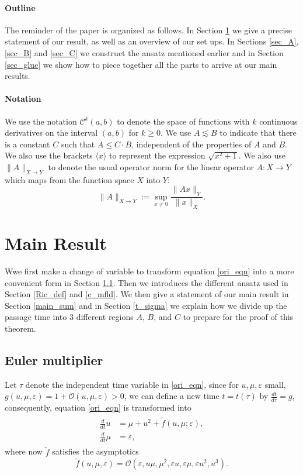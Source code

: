 \documentclass[letterpaper,11pt]{article}
\newcommand{\rmO}{\mathcal{O}}
\newcommand{\eps}{\varepsilon}
\newcommand{\lar}{ \lesssim }
\numberwithin{equation}{section}
\theoremstyle{plain}
\begin{document}
\paragraph{Outline}
The reminder of the paper is organized as follows. In Section \ref{sec_main} we give a precise statement of our result, as well as an overview of our set ups. In Sections \ref{sec_A}, \ref{sec_B} and \ref{sec_C} we construct the ansatz mentioned earlier and in Section \ref{sec_glue} we show how to piece together all the parts to arrive at our main results.


\paragraph{Notation}We use the notation $\mathcal{C}^k(a,b)$ to denote the space of functions with $k$ continuous derivatives on the interval $(a,b)$ for $k\ge 0$.  
We use $A \lar B$ to indicate that there is a constant $C$ such that $A \le C \cdot B$, independent of the properties of $A$ and $B$. We also use the brackets $\langle x \rangle$ to represent the expression $\sqrt{x^2+1}$. We also use $\|A\|_{X\to Y}$ to denote the usual operator norm for the linear operator $A: X\to Y$ which maps from the function space $X$ into $Y$:
\[
\|A\|_{X\to Y} := \sup_{ x\neq 0} \frac{\|Ax\|_Y}{\|x\|_X}.
\]



\section{Main Result}\label{sec_main}
Wwe first make a change of variable to transform equation \eqref{ori_eqn} into a more convenient form in Section \ref{euler_m}. Then we introduces the different ansatz used in Section \ref{Ric_def} and \ref{c_mfld}. We then give a statement of our main result in Section \ref{main_sum} and in Section \ref{t_sigma} we explain how we divide up the passage time into 3 different regions $A$, $B$, and $C$ to prepare for the proof of this theorem.

\subsection{Euler multiplier}\label{euler_m}
Let $\tau$ denote the independent time variable in \eqref{ori_eqn}, since for $u,\mu,\eps$ small, $g(u,\mu,\eps) = 1 + \rmO(u,\mu,\eps)>0$, we can define a new time $t = t(\tau)$ by $\frac{dt}{d\tau} = g$, consequently, equation \eqref{ori_eqn}  is transformed into
\begin{align}\label{euler_ori_eqn}
\begin{split}
\frac{d}{dt}u &= \mu+u^2+ \tilde{f}(u,\mu;\eps),\\
\frac{d}{dt}\mu &=  \eps ,
\end{split}
\end{align}
where now $\tilde{f}$ satisfies the asymptotics
\begin{equation}\label{nonlinear_asy_new}
\tilde{f}(u,\mu,\eps) = \rmO(\eps,  u\mu, \mu^2,\eps u, \eps \mu, \eps u^2, u^3).
\end{equation}  
\end{document}
